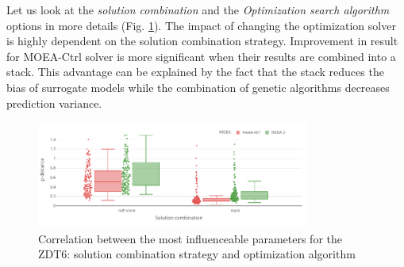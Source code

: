     Let us look at the \emph{solution combination} and the \emph{Optimization search algorithm} options in more details (Fig. \ref{fig:conf_zdt6_sign}). The impact of changing the optimization solver is highly dependent on the solution combination strategy. Improvement in result for MOEA-Ctrl solver is more significant when their results are combined into a stack. This advantage can be explained by the fact that the stack reduces the bias of surrogate models while the combination of genetic algorithms decreases prediction variance.

        \begin{figure}
            \centering
            \includegraphics[width=0.8\textwidth]{content/images/conf_zdt6_solver}
            \caption[Correlation between the most influenceable parameters for the ZDT6]{Correlation between the most influenceable parameters for the ZDT6: solution combination strategy and optimization algorithm}
            \label{fig:conf_zdt6_sign}    
        \end{figure}

